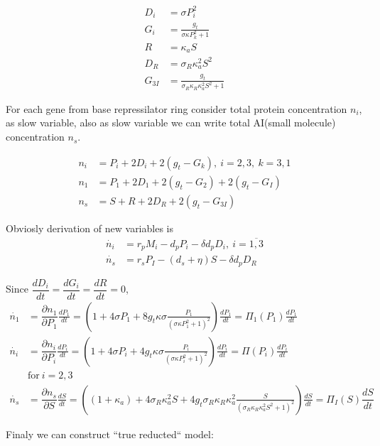 \documentclass[12pt]{article}
\begin{document}
\begin{align}
	D_i &= \sigma P_i^2\\
	G_i &= \frac{ g_t}{\sigma\kappa P_k^2 + 1} \\
	R &= \kappa_a S \\
	D_R &= \sigma_R \kappa_a^2 S^2 \\
	G_{3I} &= \frac{g_t}{\sigma_R \kappa_R \kappa_a^2 S^2 + 1}
\end{align}

For each gene from base repressilator ring consider total protein concentration $n_i$, as slow variable, also as slow variable we can write total AI(small molecule) concentration $n_s$.

\begin{align}
	n_i &= P_{i} + 2D_{i} + 2(g_t - G_{k}), \ i = 2,3, \ k = 3,1 \\
	n_1 &= P_{1} + 2D_{1} + 2(g_t - G_{2}) + 2(g_t - G_{I}) \\
	n_s &= S + R + 2D_{R} + 2(g_t - G_{3I})
\end{align}

Obviosly derivation of new variables is
\begin{align}
	\label{phDni}
	\dot{n_i} &= r_p M_{i} - d_p P_{i} - \delta d_p D_{i}, \ i = \overline{1,3} \\
	\label{phDns}
	\dot{n_s} &= r_s P_{I} - (d_s + \eta) S - \delta d_p D_R
\end{align}

Since $\dfrac{d D_i}{d t} = \dfrac{dG_i}{dt} = \dfrac{dR}{dt} = 0$,
\begin{align}
	\label{rDni}
	\dot{n_1} &= \dfrac{\partial n_1}{\partial P_1} \frac{dP_1}{dt} = \left(1 + 4\sigma P_1 + 8 g_t \kappa\sigma\frac{P_1}{(\sigma\kappa P_1^2 + 1)^2} \right)\frac{dP_1}{dt} = \Pi_1(P_1)\frac{dP_1}{dt} \\
	\dot{n_i} &= \dfrac{\partial n_i}{\partial P_i} \frac{dP_i}{dt} = \left(1 + 4\sigma P_i + 4 g_t \kappa\sigma\frac{P_i}{(\sigma\kappa P_i^2 + 1)^2}\right)\frac{dP_i}{dt} = \Pi(P_i)\frac{dP_i}{dt} \\
	&\text{for} \ i=2,3\\
	\label{rDns}
	\dot{n_s} &= \dfrac{\partial n_s}{\partial S} \frac{dS}{dt} = \left( (1+\kappa_a) + 4\sigma_R\kappa_a^2S + 4 g_t \sigma_R \kappa_R \kappa_a^2 \frac{S}{(\sigma_R \kappa_R \kappa_a^2 S^2 + 1)^2} \right) \frac{dS}{dt} = \Pi_{I}(S) \dfrac{dS}{dt}
\end{align}

Finaly we can construct ``true reducted`` model:
\end{document}
